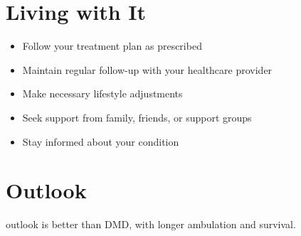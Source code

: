 \section{Living with It}
\begin{itemize}[noitemsep]
  \item Follow your treatment plan as prescribed
  \item Maintain regular follow-up with your healthcare provider
  \item Make necessary lifestyle adjustments
  \item Seek support from family, friends, or support groups
  \item Stay informed about your condition
\end{itemize}
\section{Outlook}
outlook is better than DMD, with longer ambulation and survival.
